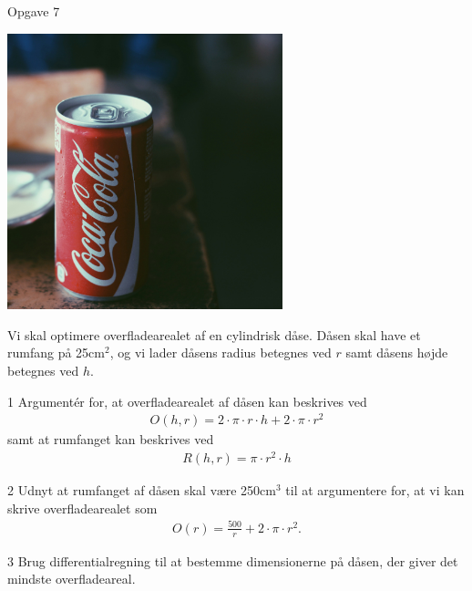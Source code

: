\documentclass[12pt,x11names,a4paper]{article}
\begin{document}
\begin{opgavetekst}{Opgave 7}
	\begin{center}
		\includegraphics[width = 0.6\textwidth]{Billeder/cola}
	\end{center}
	Vi skal optimere overfladearealet af en cylindrisk dåse. Dåsen skal have et rumfang på 25cm$^2$, og vi
	lader dåsens radius betegnes ved $r$ samt dåsens højde betegnes ved $h$.
\end{opgavetekst}
\begin{delopgave}{}{1}
	Argumentér for, at overfladearealet af dåsen kan beskrives ved 
	\begin{align*}
		O(h,r) = 2 \cdot \pi \cdot r\cdot h + 2 \cdot \pi \cdot r^2
	\end{align*}
	samt at	rumfanget kan beskrives ved 
	\begin{align*}
		R(h,r) =  \pi \cdot r^2 \cdot h
	\end{align*}
\end{delopgave}
\begin{delopgave}{}{2}
	Udnyt at rumfanget af dåsen skal være 250cm$^3$ til at argumentere for, at vi kan skrive overfladearealet 
	som
	\begin{align*}
		O(r) = \frac{500}{r} + 2\cdot \pi \cdot r^2.
	\end{align*}
\end{delopgave}
\begin{delopgave}{}{3}
	Brug differentialregning til at bestemme dimensionerne på dåsen, der giver det mindste overfladeareal. 
\end{delopgave}
\end{document}
